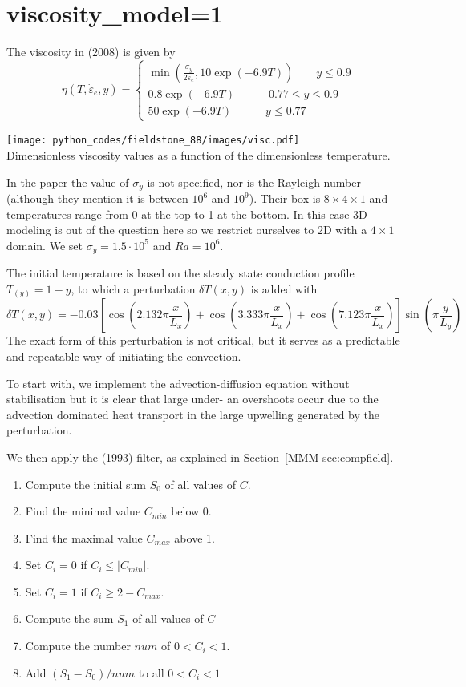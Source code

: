 \section*{viscosity\_model=1}

The viscosity in \textcite{bugg08} (2008) is given by 
\[
\eta(T,\dot{\varepsilon}_e,y) =
\left\{
\begin{array}{c}
\min \left(  \frac{\sigma_y}{2 \dot{\varepsilon}_e} , 10\exp(-6.9T)  \right) \qquad y\le 0.9 \\
0.8 \exp(-6.9T) \qquad\quad  0.77\le y \le 0.9 \\
50 \exp(-6.9T) \qquad\quad y \le 0.77 
\end{array}
\right.
\]

\begin{center}
\texttt{[image: python\_codes/fieldstone\_88/images/visc.pdf]}\\
{\captionfont Dimensionless viscosity values as a function of the dimensionless temperature.}
\end{center}

In the paper the value of $\sigma_y$ is not specified, nor is the Rayleigh number (although 
they mention it is between $10^6$ and $10^9$).
Their box is $8\times 4 \times 1$ and temperatures range from 0 at the top to 1 at the bottom.
In this case 3D modeling is out of the question here so we restrict ourselves to 2D with a $4\times 1$ domain. 
We set $\sigma_y=1.5\cdot 10^5$ and $Ra=10^6$.

The initial temperature is based on the steady state conduction profile $T_(y)=1-y$, to which a
perturbation $\delta T(x,y)$ is added with 
\[
\delta T(x,y) = -0.03 \left[ \cos\left(2.132\pi \frac{x}{L_x}\right)
+ \cos\left(3.333\pi  \frac{x}{L_x}\right)
+ \cos\left(7.123 \pi  \frac{x}{L_x} \right) \right] \sin \left(\pi  \frac{y}{L_y} \right)
\]
The exact form of this perturbation is not critical, but it serves as a predictable and repeatable way of 
initiating the convection.

To start with, we implement the advection-diffusion equation without stabilisation but it is clear that 
large under- an overshoots occur due to the advection dominated heat transport in the large upwelling 
generated by the perturbation.

We then apply the \textcite{leka93} (1993) filter, as explained 
in Section~\ref{MMM-sec:compfield}.
\begin{enumerate}
\item Compute the initial sum $S_0$ of all values of $C$.
\item Find the minimal value $C_{min}$ below 0.
\item Find the maximal value $C_{max}$ above 1.
\item Set $C_i=0$ if $C_i \leq |C_{min}|$.
\item Set $C_i=1$ if $C_i \geq 2-C_{max}$. 
\item Compute the sum $S_1$ of all values of $C$
\item Compute the number $num$ of $0 < C_i < 1$.
\item Add $(S_1-S_0)/num$ to all $0<C_i<1$
\end{enumerate}

